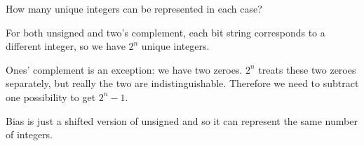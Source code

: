 \begin{blocksection}
\question
How many unique integers can be represented in each case?


\begin{solution}
For both unsigned and two’s complement, each bit string corresponds to a different integer, so we have $2^n$ unique integers.
 
Ones’ complement is an exception: we have two zeroes. $2^n$ treats these two zeroes separately, but really the two are indistinguishable. Therefore we need to subtract one possibility to get $2^n - 1$.
 
Bias is just a shifted version of unsigned and so it can represent the same number of integers.
\end{solution}

\end{blocksection}